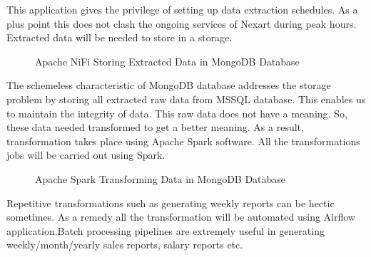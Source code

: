\documentclass[a4Paper,12pt]{report}
\begin{document}
This application gives the privilege of setting up data extraction schedules. As a plus point this does not clash the ongoing services of Nexart during peak hours. Extracted data will be needed to store in a storage.\\[12pt]
\begin{figure}[H]
\centering
{}
\caption{Apache NiFi Storing Extracted Data in MongoDB Database}
\end{figure}
The schemeless characteristic of MongoDB database addresses the storage problem by storing all extracted raw data from MSSQL database. This enables us to maintain the integrity of data. This raw data does not have a meaning. So, these data needed transformed to get a better meaning. As a result, transformation takes place using Apache Spark software. All the transformations jobs will be carried out using Spark.\\[12pt]
\begin{figure}[H]
\centering
{}
\caption{Apache Spark Transforming Data in MongoDB Database}
\end{figure}
Repetitive transformations such as generating weekly reports can be hectic sometimes. As a remedy all the transformation will be automated using Airflow application.Batch processing pipelines are extremely useful in generating weekly/month/yearly sales reports, salary reports etc.\\[12pt]
\end{document}
